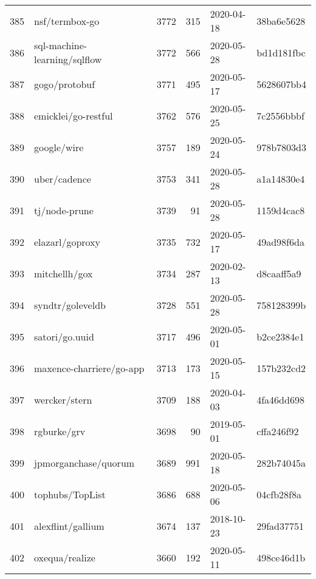 \begin{longtable}{llrrll}
    385 &                                     nsf/termbox-go &   3772 &    315 & 2020-04-18 &  38ba6e5628 \\
    386 &                       sql-machine-learning/sqlflow &   3772 &    566 & 2020-05-28 &  bd1d181fbc \\
    387 &                                      gogo/protobuf &   3771 &    495 & 2020-05-17 &  5628607bb4 \\
    388 &                                emicklei/go-restful &   3762 &    576 & 2020-05-25 &  7c2556bbbf \\
    389 &                                        google/wire &   3757 &    189 & 2020-05-24 &  978b7803d3 \\
    390 &                                       uber/cadence &   3753 &    341 & 2020-05-28 &  a1a14830e4 \\
    391 &                                      tj/node-prune &   3739 &     91 & 2020-05-28 &  1159d4cac8 \\
    392 &                                    elazarl/goproxy &   3735 &    732 & 2020-05-17 &  49ad98f6da \\
    393 &                                      mitchellh/gox &   3734 &    287 & 2020-02-13 &  d8caaff5a9 \\
    394 &                                   syndtr/goleveldb &   3728 &    551 & 2020-05-28 &  758128399b \\
    395 &                                     satori/go.uuid &   3717 &    496 & 2020-05-01 &  b2ce2384e1 \\
    396 &                           maxence-charriere/go-app &   3713 &    173 & 2020-05-15 &  157b232cd2 \\
    397 &                                      wercker/stern &   3709 &    188 & 2020-04-03 &  4fa46dd698 \\
    398 &                                        rgburke/grv &   3698 &     90 & 2019-05-01 &  cffa246f92 \\
    399 &                               jpmorganchase/quorum &   3689 &    991 & 2020-05-18 &  282b74045a \\
    400 &                                    tophubs/TopList &   3686 &    688 & 2020-05-06 &  04cfb28f8a \\
    401 &                                  alexflint/gallium &   3674 &    137 & 2018-10-23 &  29fad37751 \\
    402 &                                     oxequa/realize &   3660 &    192 & 2020-05-11 &  498ce46d1b \\

\end{longtable}
